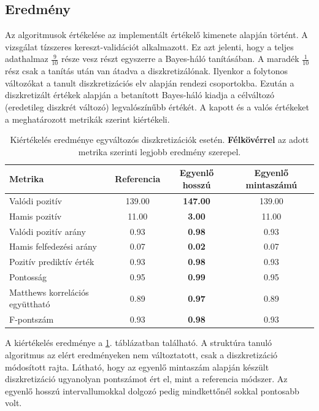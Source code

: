 \subsection{Eredmény}
Az algoritmusok értékelése az implementált értékelő kimenete alapján történt. A vizsgálat tízszeres kereszt-validációt alkalmazott. Ez azt jelenti, hogy a teljes adathalmaz $\frac{9}{10}$ része vesz részt egyszerre a Bayes-háló tanításában. A maradék $\frac{1}{10}$ rész csak a tanítás után van átadva a diszkretizálónak. Ilyenkor a folytonos változókat a tanult diszkretizációs elv alapján rendezi csoportokba. Ezután a diszkretizált értékek alapján a betanított Bayes-háló kiadja a célváltozó (eredetileg diszkrét változó) legvalószínűbb értékét. A kapott és a valós értékeket a meghatározott metrikák \cite{powers2020evaluation} szerint kiértékeli.

\begin{table}[htp]\centering
    \begin{tabular}{lccc}
        Metrika                         & Referencia & Egyenlő hosszú & Egyenlő mintaszámú \\ \hline
        Valódi pozitív                  & 139.00     & \textbf{147.00}         & 139.00             \\
        Hamis pozitív                   & 11.00      & \textbf{3.00}           & 11.00              \\
        Valódi pozitív arány            & 0.93       & \textbf{0.98}           & 0.93               \\
        Hamis felfedezési arány         & 0.07       & \textbf{0.02}           & 0.07               \\
        Pozitív prediktív érték         & 0.93       & \textbf{0.98}           & 0.93               \\
        Pontosság                       & 0.95       & \textbf{0.99}           & 0.95               \\
        Matthews korrelációs együttható & 0.89       & \textbf{0.97}           & 0.89               \\
        F-pontszám                      & 0.93       & \textbf{0.98}           & 0.93
    \end{tabular}
\caption{Kiértékelés eredménye egyváltozós diszkretizációk esetén. \textbf{Félkövérrel} az adott metrika szerinti legjobb eredmény szerepel.}
\label{tab:kiertekeles-egyvaltozos}
\end{table}

A kiértékelés eredménye a \ref{tab:kiertekeles-egyvaltozos}. táblázatban található. A struktúra tanuló algoritmus az elért eredményeken nem változtatott, csak a diszkretizáció módosított rajta. Látható, hogy az egyenlő mintaszám alapján készült diszkretizáció ugyanolyan pontszámot ért el, mint a referencia módszer. Az egyenlő hosszú intervallumokkal dolgozó pedig mindkettőnél sokkal pontosabb volt.

